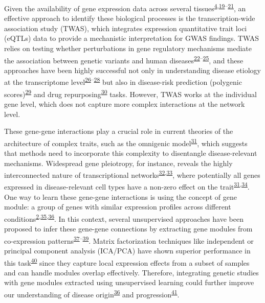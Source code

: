 \documentclass[
  a4paper,
]{article}
\begin{document}
Given the availability of gene expression data across several tissues\textsuperscript{\protect\hyperlink{ref-9Pr9idng}{4},\protect\hyperlink{ref-6SPTvFXq}{19}--\protect\hyperlink{ref-57TjOMEA}{21}}, an effective approach to identify these biological processes is the transcription-wide association study (TWAS), which integrates expression quantitative trait loci (eQTLs) data to provide a mechanistic interpretation for GWAS findings.
TWAS relies on testing whether perturbations in gene regulatory mechanisms mediate the association between genetic variants and human diseases\textsuperscript{\protect\hyperlink{ref-yEdRP9Xx}{22}--\protect\hyperlink{ref-Z8bvDdVq}{25}}, and these approaches have been highly successful not only in understanding disease etiology at the transcriptome level\textsuperscript{\protect\hyperlink{ref-ktVcsmYD}{26}--\protect\hyperlink{ref-zwpq2IXD}{28}} but also in disease-risk prediction (polygenic scores)\textsuperscript{\protect\hyperlink{ref-hSYqogYZ}{29}} and drug repurposing\textsuperscript{\protect\hyperlink{ref-17oeJ0CXy}{30}} tasks.
However, TWAS works at the individual gene level, which does not capture more complex interactions at the network level.

These gene-gene interactions play a crucial role in current theories of the architecture of complex traits, such as the omnigenic model\textsuperscript{\protect\hyperlink{ref-vpIDZCSa}{31}}, which suggests that methods need to incorporate this complexity to disentangle disease-relevant mechanisms.
Widespread gene pleiotropy, for instance, reveals the highly interconnected nature of transcriptional networks\textsuperscript{\protect\hyperlink{ref-pZZn28he}{32},\protect\hyperlink{ref-PDWEwciL}{33}}, where potentially all genes expressed in disease-relevant cell types have a non-zero effect on the trait\textsuperscript{\protect\hyperlink{ref-vpIDZCSa}{31},\protect\hyperlink{ref-LXvTZzEA}{34}}.
One way to learn these gene-gene interactions is using the concept of gene module: a group of genes with similar expression profiles across different conditions\textsuperscript{\protect\hyperlink{ref-CVF61Un5}{2},\protect\hyperlink{ref-jrAMOJCD}{35},\protect\hyperlink{ref-SjGoBywE}{36}}.
In this context, several unsupervised approaches have been proposed to infer these gene-gene connections by extracting gene modules from co-expression patterns\textsuperscript{\protect\hyperlink{ref-S4e4WaP3}{37}--\protect\hyperlink{ref-VzZoy0BD}{39}}.
Matrix factorization techniques like independent or principal component analysis (ICA/PCA) have shown superior performance in this task\textsuperscript{\protect\hyperlink{ref-1BVbSrr6M}{40}} since they capture local expression effects from a subset of samples and can handle modules overlap effectively.
Therefore, integrating genetic studies with gene modules extracted using unsupervised learning could further improve our understanding of disease origin\textsuperscript{\protect\hyperlink{ref-SjGoBywE}{36}} and progression\textsuperscript{\protect\hyperlink{ref-S56q1qoc}{41}}.
\end{document}
